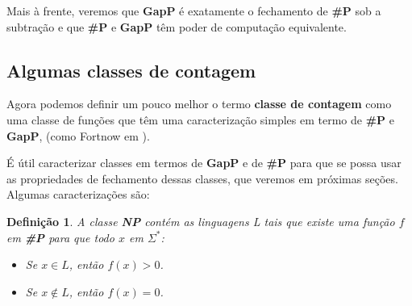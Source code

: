 \documentclass[paper=a4, fontsize=11pt]{scrartcl} %
\newtheorem{theorem}{Teorema}
\newtheorem{definition}{Definição}
\numberwithin{equation}{subsection}
\numberwithin{figure}{subsection}
\numberwithin{table}{subsection}
\numberwithin{definition}{subsection}
\numberwithin{theorem}{subsection}
\numberwithin{property}{subsection}
\numberwithin{proposition}{subsection}
\newcommand{\words}{$\Sigma^*$\xspace}
\newcommand{\SP}{\textbf{\#P}\xspace}
\newcommand{\NP}{\textbf{NP}\xspace}
\newcommand{\FP}{\textbf{FP}\xspace}
\newcommand{\gP}{\textbf{GapP}\xspace}
\newcommand{\npmach}{máquina-NP\xspace}
\begin{document}




Mais à frente, veremos que \gP é exatamente o fechamento de \SP sob a subtração e que \SP e \gP têm poder de computação equivalente.

\subsection{Algumas classes de contagem}

Agora podemos definir um pouco melhor o termo \textbf{classe de contagem} como uma classe de funções que têm uma caracterização simples em termo de \SP e \gP, (como Fortnow em \cite{Fortnow97}).

É útil caracterizar classes em termos de \gP e de \SP para que se possa usar as propriedades de fechamento dessas classes, que veremos em próximas seções. Algumas caracterizações são:

\begin{definition} A classe \NP contém as linguagens L tais que existe uma função $f$ em \SP para que todo $x$ em \words:
\begin{itemize}
  \item Se $x \in L$, então $f(x) > 0$.
  \item Se $x \notin L$, então $f(x) = 0$.
\end{itemize}
\end{definition}
\end{document}

